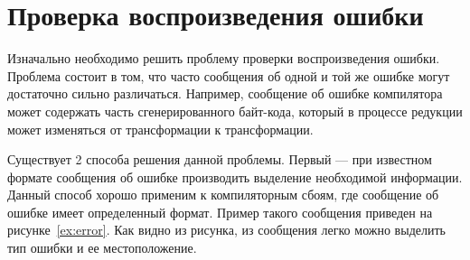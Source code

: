 \section{Проверка воспроизведения ошибки}\label{errorscheck}
Изначально необходимо решить проблему проверки воспроизведения ошибки. Проблема состоит в том, что часто сообщения об одной и той же ошибке могут достаточно сильно различаться. Например, сообщение об ошибке компилятора может содержать часть сгенерированного байт-кода, который в процессе редукции может изменяться от трансформации к трансформации.

Существует 2 способа решения данной проблемы. Первый --- при известном формате сообщения об ошибке производить выделение необходимой информации. Данный способ хорошо применим к компиляторным сбоям, где сообщение об ошибке имеет определенный формат. Пример такого сообщения приведен на рисунке~\ref{ex:error}. Как видно из рисунка, из сообщения легко можно выделить тип ошибки и ее местоположение.
%
\begin{figure}
\end{figure} 

